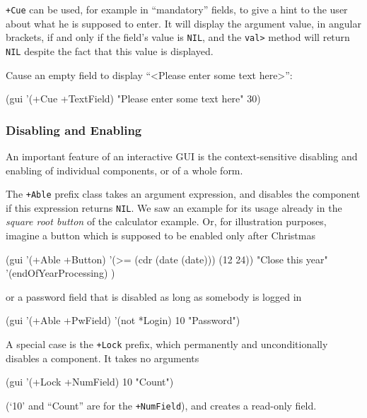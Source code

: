 \texttt{+Cue} can be used, for example in ``mandatory'' fields, to give a hint to
the user about what he is supposed to enter. It will display the
argument value, in angular brackets, if and only if the field's value is
\texttt{NIL}, and the \texttt{val>} method will return \texttt{NIL} despite the fact that
this value is displayed.

Cause an empty field to display ``\textless Please enter some text
here\textgreater '':


\begin{wideverbatim}
(gui '(+Cue +TextField) "Please enter some text here" 30)
\end{wideverbatim}


\subsubsection{ Disabling and Enabling}
\label{sec:appl-devel-disabling-and-enabling}%
An important feature of an interactive GUI is the context-sensitive
disabling and enabling of individual components, or of a whole form.

The \texttt{+Able} prefix class takes an argument expression, and disables the
component if this expression returns \texttt{NIL}. We saw an example for its
usage already in the \emph{square root button} of the
calculator example. Or, for illustration purposes, imagine a button
which is supposed to be enabled only after Christmas


\begin{wideverbatim}
(gui '(+Able +Button)
   '(>= (cdr (date (date))) (12 24))
   "Close this year"
   '(endOfYearProcessing) )
\end{wideverbatim}

or a password field that is disabled as long as somebody is logged in


\begin{wideverbatim}
(gui '(+Able +PwField) '(not *Login) 10 "Password")
\end{wideverbatim}

A special case is the \texttt{+Lock} prefix, which permanently and
unconditionally disables a component. It takes no arguments


\begin{wideverbatim}
(gui '(+Lock +NumField) 10 "Count")
\end{wideverbatim}

(`10' and ``Count'' are for the \texttt{+NumField}), and creates a read-only
field.

